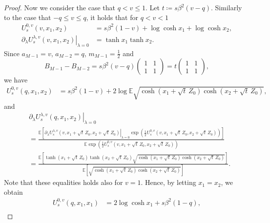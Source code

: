 \documentclass[11pt]{article}
\numberwithin{equation}{section}
\newcommand{\E}{\mathbb{E}}
\newcommand{\1}{\mathbf 1}
\begin{document}
\begin{proof}
Now we consider the case that $q<v\le1$. Let $t \coloneqq s\beta^2(v-q)$.
Similarly to the case that $-q\le v\le q$, it holds that for $q< v< 1$
\begin{align*}
 U_s^{0,v}(v,x_1,x_2)
 &=s\beta^2(1-v)+\log\cosh x_1+\log\cosh x_2,\\
 \left.\partial_\lambda U_s^{\lambda,v}(v,x_1,x_2)
 \right|_{\lambda=0}
 & =\tanh x_1\tanh x_2.
\end{align*}
Since $a_{M-1} = v$, $a_{M-2}=q$, $m_{M-1}= \frac{1}{2}$ and 
\[
B_{M-1} - B_{M-2} = s\beta ^2 (v-q)\left( \begin{array}{cc} 1&1\\ 1&1 \end{array}\right) = t \left( \begin{array}{cc} 1&1\\ 1&1 \end{array}\right),
\]
we have%
\begin{align*}
 U_s^{0,v}(q,x_1 ,x_2 )
 &=s\beta^2(1-v)
 + 2 \log\E \sqrt{ \cosh(x_1 +\sqrt t\,Z_0) \cosh(x_2+\sqrt t\,Z_0 )} ,
\end{align*}
and 
\begin{align*}
 & \left.\partial_\lambda U_s^{\lambda,v}(q,x_1,x_2) \right|_{\lambda=0} \\
 &= \frac{\E \left[ \left.\partial_\lambda U_s^{\lambda,v}(v,x_1 +\sqrt t\,Z_0 ,x_2 +\sqrt t\,Z_0)
 \right|_{\lambda=0}\exp \left( \frac{1}{2} U_s^{0,v}(v,x_1 +\sqrt t\,Z_0 ,x_2 +\sqrt t\,Z_0 ) \right) \right] }{\E \exp \left( \frac{1}{2} U_s^{0,v}(v,x_1 +\sqrt t\,Z_0 ,x_2 +\sqrt t\,Z_0 ) \right) } \\
 &= \frac{\E \left[ \tanh (x_1 +\sqrt t\,Z_0) \tanh (x_2 +\sqrt t\,Z_0)
 \sqrt{\cosh (x_1 +\sqrt t\,Z_0) \cosh (x_2 +\sqrt t\,Z_0)} \right] }{\E \left[ \sqrt{\cosh (x_1 +\sqrt t\,Z_0) \cosh (x_2 +\sqrt t\,Z_0)} \right] } .
\end{align*}
Note that these equalities holds also for $v=1$.
Hence, by letting $x_1=x_2$, we obtain
\begin{align}
U_s^{0,v}(q,x_1 ,x_1) &= 2\log\cosh x_1 +s\beta^2(1-q) , \label{eq:GT-positive-diagonal-value} \\

\end{align}
\end{proof}
\end{document}
